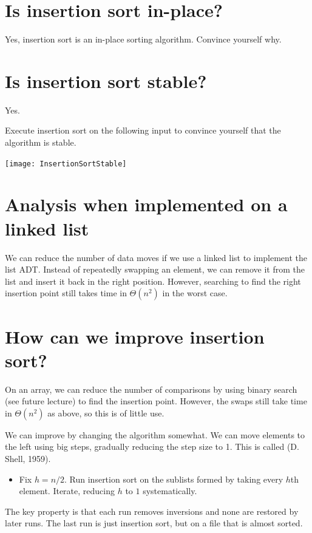 \section{Is insertion sort in-place?}
Yes, insertion sort is an in-place sorting algorithm. Convince yourself why.

\section{Is insertion sort stable?}
Yes.

\begin{Boxample}[0]
Execute insertion sort on the following input to convince yourself that the algorithm is stable.
\begin{center}
\texttt{[image: InsertionSortStable]} 
\end{center}
\end{Boxample}

\section{Analysis when implemented on a linked list}
We can reduce the number of data moves if we use a linked list to implement 
the list ADT.
Instead of repeatedly swapping an element, we can remove it from the list and insert it back in the right position.
However, searching to find the right insertion point still takes time in
$\Theta(n^2)$ in the worst case.

\section{How can we improve insertion sort?}
On an array, we can reduce the number of comparisons by using binary search (see future lecture) to find 
the insertion point. However, the swaps still take time in $\Theta(n^2)$ as above, so this is of little use.

We can improve by changing the algorithm somewhat.
We can move elements to the left using big steps, gradually reducing the 
step size to 1. This is called  (D. Shell, 1959). 
\begin{itemize}
  \item Fix $h = n/2$. Run insertion sort on the sublists formed by taking 
every $h$th element. Iterate, reducing $h$ to $1$ systematically. 
\end{itemize}
The key property is that each run removes inversions and none are 
restored by later runs. The last run is just insertion sort, but on a file that 
is almost sorted.

